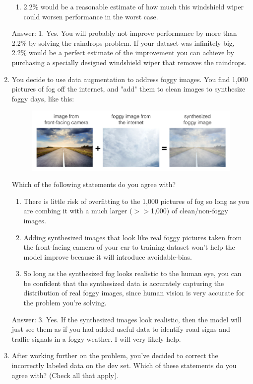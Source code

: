 \documentclass[12pt]{article}
\numberwithin{equation}{section}
\begin{document}
\begin{enumerate}
\begin{enumerate}
		\item 2.2\% would be a reasonable estimate of how much this windshield wiper could worsen performance in the worst case.
	\end{enumerate}
	Answer: 1. Yes. You will probably not improve performance by more than 2.2\% by solving the raindrops problem. If your dataset was infinitely big, 2.2\% would be a perfect estimate of the improvement you can achieve by purchasing a specially designed windshield wiper that removes the raindrops.
	\item You decide to use data augmentation to address foggy images. You find 1,000 pictures of fog off the internet, and "add" them to clean images to synthesize foggy days, like this: \par
	\begin{figure}[H]
		\includegraphics[width=\linewidth]{fig_DL/autodrive.png}
		\caption{}
		\label{fig:}
	\end{figure}
	Which of the following statements do you agree with?
	\begin{enumerate}
		\item There is little risk of overfitting to the 1,000 pictures of fog so long as you are combing it with a much larger ($>>$1,000) of clean/non-foggy images.
		\item Adding synthesized images that look like real foggy pictures taken from the front-facing camera of your car to training dataset won't help the model improve because it will introduce avoidable-bias.
		\item So long as the synthesized fog looks realistic to the human eye, you can be confident that the synthesized data is accurately capturing the distribution of real foggy images, since human vision is very accurate for the problem you're solving.
	\end{enumerate}
	Answer: 3. Yes. If the synthesized images look realistic, then the model will just see them as if you had added useful data to identify road signs and traffic signals in a foggy weather. I will very likely help.
	\item After working further on the problem, you've decided to correct the incorrectly labeled data on the dev set. Which of these statements do you agree with? (Check all that apply).

\end{enumerate}
\end{document}
